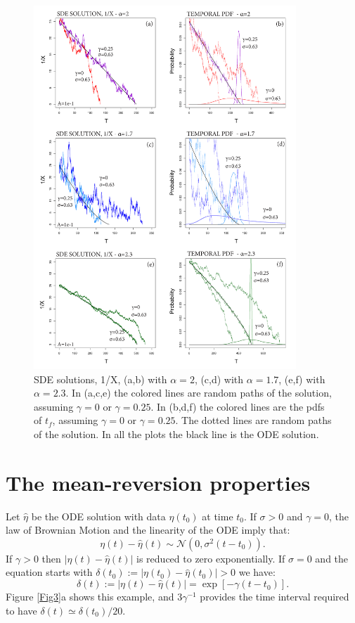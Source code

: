 \documentclass{article}
\begin{document}
\begin{figure}[H]
\centering
\includegraphics[width=0.88\textwidth]{Fig2_plus.png}
\caption{SDE solutions, 1/X, (a,b) with $\alpha=2$, (c,d) with $\alpha=1.7$, (e,f) with $\alpha=2.3$. In (a,c,e) the colored lines are random paths of the solution, assuming $\gamma=0$ or $\gamma=0.25$. In (b,d,f) the colored lines are the pdfs of $t_f$, assuming $\gamma=0$ or $\gamma=0.25$. The dotted lines are random paths of the solution. In all the plots the black line is the ODE solution.}
\label{Fig2}
\end{figure}

\section{The mean-reversion properties}
Let $\hat\eta$ be the ODE solution with data $\eta(t_0)$ at time $t_0$. If $\sigma>0$ and $\gamma=0$, the law of Brownian Motion and the linearity of the ODE imply that:
$$\eta(t)-\hat\eta(t)\sim \mathcal N\left(0,\sigma^2(t-t_0)\right).$$
If $\gamma>0$ then $\left|\eta(t)-\hat\eta(t)\right|$ is reduced to zero exponentially. If $\sigma=0$ and the equation starts with $\delta(t_0):=|\eta(t_0)-\hat\eta(t_0)|>0$ we have:
$$\delta(t):=\left|\eta(t)-\hat\eta(t)\right|=\exp[-\gamma(t-t_0)].$$
Figure \ref{Fig3}a shows this example, and $3\gamma^{-1}$ provides the time interval required to have $\delta(t)\simeq\delta(t_0)/20$.
\end{document}
